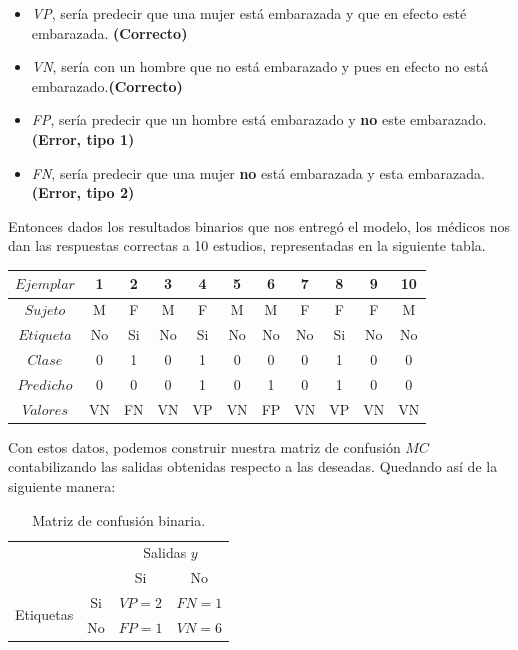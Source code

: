 \begin{description}
\begin{example}
   \begin{itemize}
    \item \emph{VP}, sería predecir que una mujer está embarazada y que en efecto esté embarazada. \textbf{(Correcto)}
    \item \emph{VN}, sería con un hombre que no está embarazado y pues en efecto no está embarazado.\textbf{(Correcto)}  
    \item \emph{FP}, sería predecir que un hombre está embarazado y \textbf{no} este embarazado. \textbf{(Error, tipo 1)} 
    \item \emph{FN}, sería predecir que una mujer \textbf{no} está embarazada y esta embarazada. \textbf{(Error, tipo 2)}
   \end{itemize}


   Entonces dados los resultados binarios que nos entregó el modelo, los médicos nos dan las respuestas correctas a 10
   estudios, representadas en la siguiente tabla.
 
   \begin{center}
     \begin{tabular}{c|cccccccccc}

      $Ejemplar$ & 1   & 2  & 3  & 4  & 5  & 6  & 7  & 8  & 9  & 10  \\ \hline
      $Sujeto$   & M   & F  & M  & F  & M  & M  & F  & F  & F  & M  \\ \hline
      $Etiqueta$ & No  & Si & No & Si & No & No & No & Si & No & No  \\ \hline
      $Clase$    & 0   & 1  & 0  & 1  & 0  & 0  & 0  & 1  & 0  & 0  \\ \hline
      $Predicho$ & 0   & 0  & 0  & 1  & 0  & 1  & 0  & 1  & 0  & 0  \\ \hline
      $Valores$  & VN  & FN & VN & VP & VN & FP & VN & VP & VN & VN  \\ \hline
   
     \end{tabular}
   \end{center}

   Con estos datos, podemos construir nuestra matriz de confusión $MC$ contabilizando las salidas obtenidas respecto a las deseadas. Quedando así de la siguiente manera:

   \begin{table}[H]
    \begin{center}
     \begin{tabular}{|c|c|c|c|}
     \cline{3-4}
     \multicolumn{2}{c|}{} & \multicolumn{2}{c|}{Salidas $y$} \\
     \cline{3-4}
     \multicolumn{2}{c|}{} & Si & No \\
     \hline
     \multirow{3}{*}{Etiquetas} & Si & $VP = 2$ & $FN = 1$ \\
     \cline{2-4}
     & No & $FP=1$ & $VN = 6$  \\
     \hline
     \end{tabular}
    \end{center}
    \caption{Matriz de confusión binaria.}
    \label{Table2}
   \end{table}


\end{example}
\end{description}
